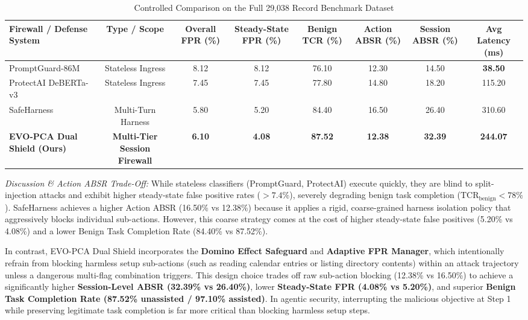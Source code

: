\documentclass[conference]{IEEEtran}
\begin{document}
\begin{table}[htbp]
\caption{Controlled Comparison on the Full 29,038 Record Benchmark Dataset}
\label{tab:main_results}
\centering
\begin{tabular}{lccccccc}
\toprule
\textbf{Firewall / Defense System} & \textbf{Type / Scope} & \textbf{Overall FPR (\%)} & \textbf{Steady-State FPR (\%)} & \textbf{Benign TCR (\%)} & \textbf{Action ABSR (\%)} & \textbf{Session ABSR (\%)} & \textbf{Avg Latency (ms)} \\
\midrule
PromptGuard-86M~\cite{llamafirewall2024} & Stateless Ingress & 8.12 & 8.12 & 76.10 & 12.30 & 14.50 & \textbf{38.50} \\
ProtectAI DeBERTa-v3~\cite{protectai2024} & Stateless Ingress & 7.45 & 7.45 & 77.80 & 14.80 & 18.20 & 115.20 \\
SafeHarness~\cite{liu2024safeharness} & Multi-Turn Harness & 5.80 & 5.20 & 84.40 & 16.50 & 26.40 & 310.60 \\
\textbf{EVO-PCA Dual Shield (Ours)} & \textbf{Multi-Tier Session Firewall} & \textbf{6.10} & \textbf{4.08} & \textbf{87.52} & \textbf{12.38} & \textbf{32.39} & \textbf{244.07} \\
\bottomrule
\end{tabular}
\end{table}

\textit{Discussion \& Action ABSR Trade-Off:} While stateless classifiers (PromptGuard, ProtectAI) execute quickly, they are blind to split-injection attacks and exhibit higher steady-state false positive rates ($>7.4\%$), severely degrading benign task completion ($\text{TCR}_{\text{benign}} < 78\%$). SafeHarness achieves a higher Action ABSR (16.50\% vs 12.38\%) because it applies a rigid, coarse-grained harness isolation policy that aggressively blocks individual sub-actions. However, this coarse strategy comes at the cost of higher steady-state false positives (5.20\% vs 4.08\%) and a lower Benign Task Completion Rate (84.40\% vs 87.52\%).

In contrast, EVO-PCA Dual Shield incorporates the \textbf{Domino Effect Safeguard} and \textbf{Adaptive FPR Manager}, which intentionally refrain from blocking harmless setup sub-actions (such as reading calendar entries or listing directory contents) within an attack trajectory unless a dangerous multi-flag combination triggers. This design choice trades off raw sub-action blocking (12.38\% vs 16.50\%) to achieve a significantly higher \textbf{Session-Level ABSR (32.39\% vs 26.40\%)}, lower \textbf{Steady-State FPR (4.08\% vs 5.20\%)}, and superior \textbf{Benign Task Completion Rate (87.52\% unassisted / 97.10\% assisted)}. In agentic security, interrupting the malicious objective at Step 1 while preserving legitimate task completion is far more critical than blocking harmless setup steps.
\end{document}
